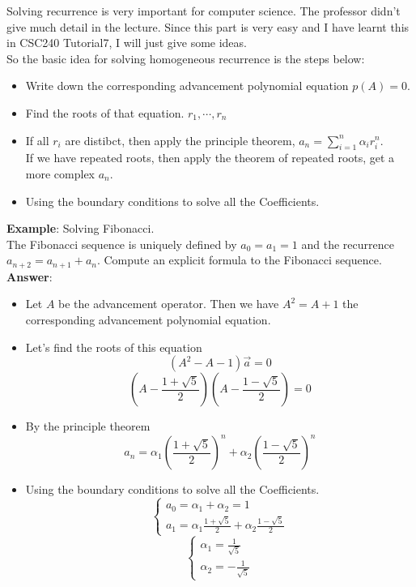 Solving recurrence is very important for computer science. 
The professor didn't give much detail in the lecture. Since this part is very easy and I have learnt this in CSC240 Tutorial7, I will just give some ideas.\\

So the basic idea for solving homogeneous recurrence is the steps below:
\begin{itemize}
    \item Write down the corresponding advancement polynomial equation $p(A)=0$.
    \item Find the roots of that equation. $r_1, \cdots ,r_n$
    \item If all $r_i$ are distibct, then apply the principle theorem, $a_n=\sum_{i=1}^n\alpha_ir_i^n$.\\
    If we have repeated roots, then apply the theorem of repeated roots, get a more complex $a_n$.
    \item Using the boundary conditions to solve all the Coefficients.
\end{itemize}

\noindent \textbf{Example}: Solving Fibonacci.\\
The Fibonacci sequence is uniquely defined by $a_0=a_1=1$ and the recurrence $a_{n+2}=a_{n+1}+a_n$. Compute an explicit formula to the Fibonacci sequence.\\

\noindent \textbf{Answer}:\\
\begin{itemize}
    \item Let $A$ be the advancement operator. Then we have $A^2=A+1$ the corresponding advancement polynomial equation.
    \item Let's find the roots of this equation $$(A^2-A-1)\vec{a}=0$$ $$(A-\frac{1+\sqrt{5}}{2})(A-\frac{1-\sqrt{5}}{2})=0$$
    \item By the principle theorem $$a_n=\alpha_1(\frac{1+\sqrt{5}}{2})^n+\alpha_2(\frac{1-\sqrt{5}}{2})^n$$
    \item Using the boundary conditions to solve all the Coefficients.
    \begin{equation}
        \begin{cases}
            a_0=\alpha_1+\alpha_2=1\\
            a_1=\alpha_1 \frac{1+\sqrt{5}}{2}+\alpha_2 \frac{1-\sqrt{5}}{2}
        \end{cases}
    \end{equation}
    \begin{equation}
        \begin{cases}
            \alpha_1=\frac{1}{\sqrt{5}}\\
            \alpha_2=-\frac{1}{\sqrt{5}}
        \end{cases}
    \end{equation}
\end{itemize}


